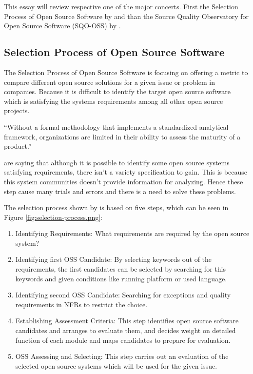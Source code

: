 \documentclass[DIV=calc,paper=a4,fontsize=9pt,twocolumn]{scrartcl}
\begin{document}
This essay will review respective one of the major concerts. First the Selection Process of Open Source Software by \citet{lee2007study} and than the Source Quality Observatory for Open Source Software (SQO-OSS) by \citet{samoladas2008sqo}.

\subsection{Selection Process of Open Source Software}

The Selection Process of Open Source Software is focusing on offering a metric to compare different open source solutions for a given issue or problem in companies. Because it is difficult to identify the target open source software which is satisfying the systems requirements among all other open source projects. \citep{lee2007study}

\enquote{Without a formal methodology that implements a standardized analytical framework, organizations are limited in their ability to assess the maturity of a product.} \citep{golden08}

\citet{lee2007study} are saying that although it is possible to identify some open source systems satisfying requirements, there isn't a variety specification to gain. This is because this system communities doesn't provide information for analyzing. Hence these step cause many trials and errors and there is a need to solve these problems.

The selection process shown by \citet{lee2007study} is based on five steps, which can be seen in Figure \ref{fig:selection-process.png}:

\begin{enumerate}
    \item Identifying Requirements: What requirements are required by the open source system?
    \item Identifying first OSS Candidate: By selecting keywords out of the requirements, the first candidates can be selected by searching for this keywords and given conditions like running platform or used language.
    \item Identifying second OSS Candidate: Searching for exceptions and quality requirements in NFRs to restrict the choice.
    \item Establishing Assessment Criteria: This step identifies open source software candidates and arranges to evaluate them, and decides weight on detailed function of each module and maps candidates to prepare for evaluation.
    \item OSS Assessing and Selecting: This step carries out an evaluation of the selected open source systems which will be used for the given issue. 
\end{enumerate}
\end{document}
